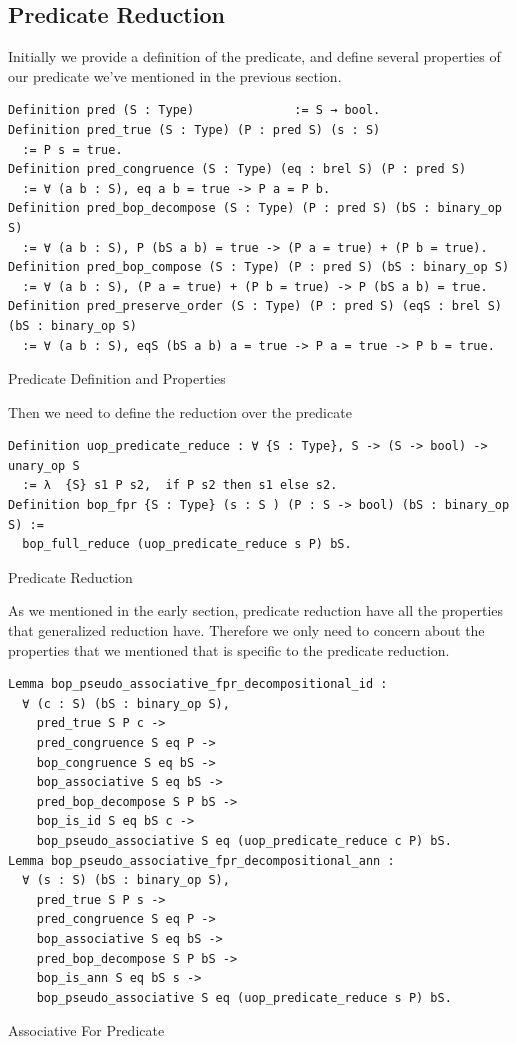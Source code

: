 \documentclass[a4paper,12pt,twoside,openright]{report}
\begin{document}
\subsection{Predicate Reduction}
Initially we provide a definition of the predicate, and define several properties of our predicate we've mentioned in the previous section.
\begin{listing}[H]
\begin{verbatim}
Definition pred (S : Type)              := S → bool.
Definition pred_true (S : Type) (P : pred S) (s : S) 
  := P s = true. 
Definition pred_congruence (S : Type) (eq : brel S) (P : pred S) 
  := ∀ (a b : S), eq a b = true -> P a = P b.
Definition pred_bop_decompose (S : Type) (P : pred S) (bS : binary_op S) 
  := ∀ (a b : S), P (bS a b) = true -> (P a = true) + (P b = true).
Definition pred_bop_compose (S : Type) (P : pred S) (bS : binary_op S) 
  := ∀ (a b : S), (P a = true) + (P b = true) -> P (bS a b) = true.
Definition pred_preserve_order (S : Type) (P : pred S) (eqS : brel S) (bS : binary_op S)
  := ∀ (a b : S), eqS (bS a b) a = true -> P a = true -> P b = true.
\end{verbatim}
\caption{Predicate Definition and Properties} 
\label{coq:def:predicate}
\end{listing}
Then we need to define the reduction over the predicate 
\begin{listing}[H]
\begin{verbatim}
Definition uop_predicate_reduce : ∀ {S : Type}, S -> (S -> bool) -> unary_op S 
  := λ  {S} s1 P s2,  if P s2 then s1 else s2.
Definition bop_fpr {S : Type} (s : S ) (P : S -> bool) (bS : binary_op S) := 
  bop_full_reduce (uop_predicate_reduce s P) bS.
\end{verbatim}
\caption{Predicate Reduction} 
\label{coq:def:predicate_reduction}
\end{listing}
As we mentioned in the early section, predicate reduction have all the properties that generalized reduction have. Therefore we only need to concern about the properties that we mentioned that is specific to the predicate reduction.
\begin{listing}[H]
\begin{verbatim}
Lemma bop_pseudo_associative_fpr_decompositional_id :
  ∀ (c : S) (bS : binary_op S),
    pred_true S P c ->
    pred_congruence S eq P ->
    bop_congruence S eq bS ->     
    bop_associative S eq bS -> 
    pred_bop_decompose S P bS ->
    bop_is_id S eq bS c -> 
    bop_pseudo_associative S eq (uop_predicate_reduce c P) bS. 
Lemma bop_pseudo_associative_fpr_decompositional_ann :
  ∀ (s : S) (bS : binary_op S),
    pred_true S P s -> 
    pred_congruence S eq P ->
    bop_associative S eq bS ->    
    pred_bop_decompose S P bS ->
    bop_is_ann S eq bS s ->     
    bop_pseudo_associative S eq (uop_predicate_reduce s P) bS.

\end{verbatim}
\caption{Associative For Predicate} 
\label{coq:proof:predicate_associative}
\end{listing}
\end{document}

